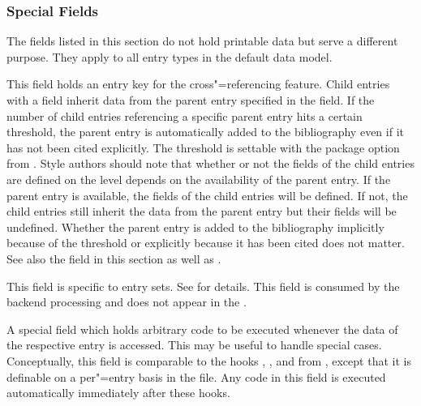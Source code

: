 \documentclass{ltxdockit}[2011/03/25]
\newcommand*{\biblatex}{\sty{biblatex}\xspace}
\begin{document}
\subsubsection{Special Fields}
\label{bib:fld:spc}

The fields listed in this section do not hold printable data but serve a different purpose. They apply to all entry types in the default data model.

\begin{fieldlist}


This field holds an entry key for the cross"=referencing feature. Child entries with a  field inherit data from the parent entry specified in the  field. If the number of child entries referencing a specific parent entry hits a certain threshold, the parent entry is automatically added to the bibliography even if it has not been cited explicitly. The threshold is settable with the  package option from . Style authors should note that whether or not the  fields of the child entries are defined on the \biblatex level depends on the availability of the parent entry. If the parent entry is available, the  fields of the child entries will be defined. If not, the child entries still inherit the data from the parent entry but their  fields will be undefined. Whether the parent entry is added to the bibliography implicitly because of the threshold or explicitly because it has been cited does not matter. See also the  field in this section as well as .


This field is specific to entry sets. See  for details. This field is consumed by the backend processing and does not appear in the .


A special field which holds arbitrary \tex code to be executed whenever the data of the respective entry is accessed. This may be useful to handle special cases. Conceptually, this field is comparable to the hooks , , and  from , except that it is definable on a per"=entry basis in the  file. Any code in this field is executed automatically immediately after these hooks.


\end{fieldlist}
\end{document}
